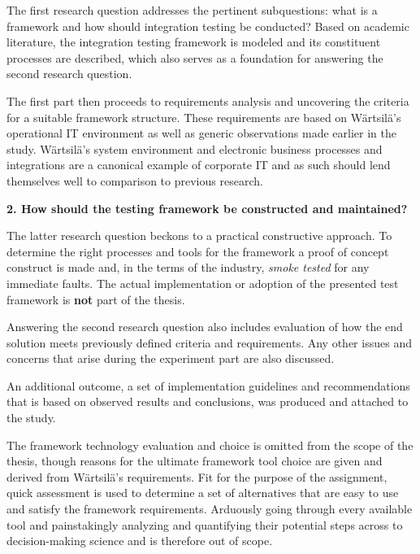 \documentclass[12pt,a4paper,oneside,pdftex]{report}
\begin{document}
The first research question addresses the pertinent subquestions: what is a framework and how should integration testing be conducted? Based on academic literature, the integration testing framework is modeled and its constituent processes are described, which also serves as a foundation for answering the second research question.

The first part then proceeds to requirements analysis and uncovering the criteria for a suitable framework structure. These requirements are based on Wärtsilä's operational IT environment as well as generic observations made earlier in the study. Wärtsilä's system environment and electronic business processes and integrations are a canonical example of corporate IT and as such should lend themselves well to comparison to previous research. \\


\begin{adjustwidth}{2.5em}{0pt}
\textbf{2. How should the testing framework be constructed and maintained?} \\
\end{adjustwidth}

The latter research question beckons to a practical constructive approach. To determine the right processes and tools for the framework a proof of concept construct is made and, in the terms of the industry, \emph{smoke tested} for any immediate faults. The actual implementation or adoption of the presented test framework is \textbf{not} part of the thesis.

Answering the second research question also includes evaluation of how the end solution meets previously defined criteria and requirements. Any other issues and concerns that arise during the experiment part are also discussed.

An additional outcome, a set of implementation guidelines and recommendations that is based on observed results and conclusions, was produced and attached to the study. %

The framework technology evaluation and choice is omitted from the scope of the thesis, though reasons for the ultimate framework tool choice are given and derived from Wärtsilä's requirements. Fit for the purpose of the assignment, quick assessment is used to determine a set of alternatives that are easy to use and satisfy the framework requirements. Arduously going through every available tool and painstakingly analyzing and quantifying their potential steps across to decision-making science and is therefore out of scope. 
\end{document}
